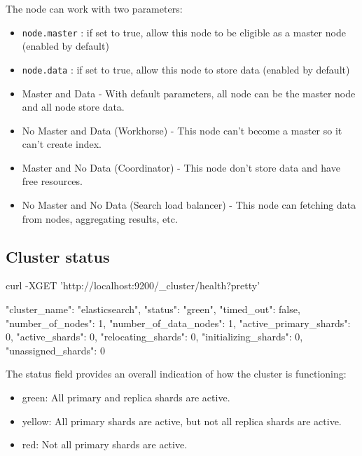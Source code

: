 \documentclass[]{beamer}
\begin{document}
\begin{frame}{\subsecname{}}
  The node can work with two parameters:
  \begin{itemize}
    \item \texttt{node.master} : if set to true, allow this node to be eligible as a master node (enabled by default)
    \item \texttt{node.data} : if set to true, allow this node to store data (enabled by default)
  \end{itemize}
\end{frame}

\begin{frame}{\subsecname{}}
  \begin{itemize}
    \item Master and Data - With default parameters, all node can be the master node and all node store data.
    \item No Master and Data (Workhorse) - This node can't become a master so it can't create index.
    \item Master and No Data (Coordinator) - This node don't store data and have free resources.
    \item No Master and No Data (Search load balancer) - This node can fetching data from nodes, aggregating results, etc.
  \end{itemize}
\end{frame}

\subsection{Cluster status}

\begin{frame}[containsverbatim]{\subsecname{}}
  \begin{command}
curl -XGET 'http://localhost:9200/_cluster/health?pretty'
  \end{command}

  \begin{command}
{
  "cluster_name":          "elasticsearch",
  "status":                "green", 
  "timed_out":             false,
  "number_of_nodes":       1,
  "number_of_data_nodes":  1,
  "active_primary_shards": 0,
  "active_shards":         0,
  "relocating_shards":     0,
  "initializing_shards":   0,
  "unassigned_shards":     0
}
  \end{command}
\end{frame}

\begin{frame}{\subsecname{}}
  The status field provides an overall indication of how the cluster is functioning:
  \begin{itemize}
    \item green: All primary and replica shards are active.
    \item yellow: All primary shards are active, but not all replica shards are active.
    \item red: Not all primary shards are active.
  \end{itemize}
\end{frame}
\end{document}
